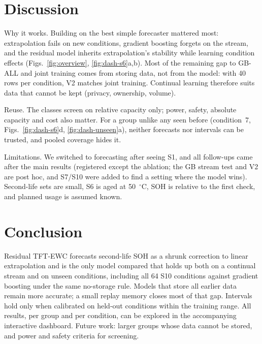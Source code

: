 
\section{Discussion}
\label{sec:discussion}

Why it works. Building on the best simple forecaster mattered most: extrapolation fails on new conditions, gradient boosting forgets on the stream, and the residual model inherits extrapolation's stability while learning condition effects (Figs.~\ref{fig:overview}, \ref{fig:dash-s6}a,b). Most of the remaining gap to GB-ALL and joint training comes from storing data, not from the model: with 40 rows per condition, V2 matches joint training. Continual learning therefore suits data that cannot be kept (privacy, ownership, volume).

Reuse. The classes screen on relative capacity only; power, safety, absolute capacity and cost also matter. For a group unlike any seen before (condition~7, Figs.~\ref{fig:dash-s6}d, \ref{fig:dash-unseen}a), neither forecasts nor intervals can be trusted, and pooled coverage hides it.

Limitations. We switched to forecasting after seeing S1, and all follow-ups came after the main results (registered except the ablation; the GB stream test and V2 are post hoc, and S7/S10 were added to find a setting where the model wins). Second-life sets are small, S6 is aged at 50~$^\circ$C, SOH is relative to the first check, and planned usage is assumed known.

\section{Conclusion}
\label{sec:conclusion}

Residual TFT-EWC forecasts second-life SOH as a shrunk correction to linear extrapolation and is the only model compared that holds up both on a continual stream and on unseen conditions, including all 64 S10 conditions against gradient boosting under the same no-storage rule. Models that store all earlier data remain more accurate; a small replay memory closes most of that gap. Intervals hold only when calibrated on held-out conditions within the training range. All results, per group and per condition, can be explored in the accompanying interactive dashboard. Future work: larger groups whose data cannot be stored, and power and safety criteria for screening.

